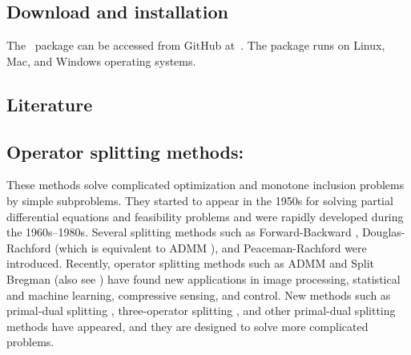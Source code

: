 
\subsection{Download and installation}
The \pkg~package can be accessed from GitHub at~\repo. The package runs on Linux, Mac, and Windows operating systems.
\subsection{Literature}\label{sec:review}
\subsection*{Operator splitting methods:}  These methods solve complicated optimization and monotone inclusion problems by simple subproblems. They started to appear in the 1950s for solving partial differential equations and feasibility problems and were rapidly developed during the 1960s--1980s. Several splitting methods such as Forward-Backward \citep{Passty1979_ergodic}, Douglas-Rachford \citep{DR56} (which is equivalent to ADMM \citep{GabayMercier1976_dual,GlowinskiMarroco1975_approximation}), and Peaceman-Rachford \citep{PR} were introduced. Recently,
operator splitting methods such as ADMM and Split Bregman \citep{GoldsteinOsher2009_split} (also see \citep{WangYangYinZhang2008_NewAlternating}) have found new applications in image processing,
statistical and machine learning, compressive sensing, and control. New methods such as primal-dual splitting \citep{Condat2013_primaldual,Vu2013_splitting}, three-operator splitting \citep{DavisYin2015_threeoperator}, and other primal-dual splitting methods \citep{LiShenXuZhang2015_multistep,ChenHuangZhang2016_primaldual,ChenHuangZhang2016_primalduala} have appeared, and they are designed to solve more complicated problems.


